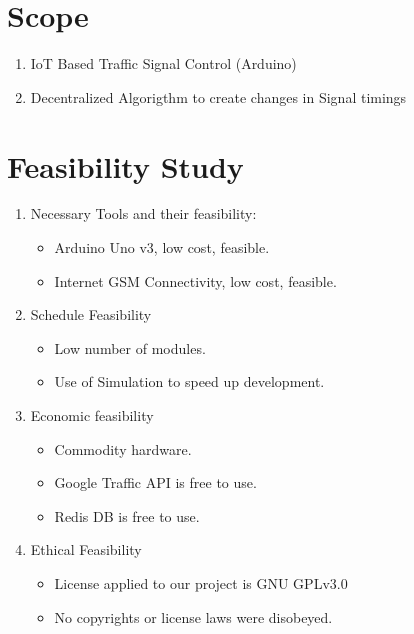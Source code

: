 \documentclass[12pt,a4paper,final]{article}
\begin{document}
\begin{flushleft}
\noindent
\section{Scope}
\begin{enumerate}
\item
IoT Based Traffic Signal Control (Arduino)
\item
Decentralized Algorigthm to create changes in Signal timings
\end{enumerate}

\noindent
\section{Feasibility Study}
\begin{enumerate}
\item
Necessary Tools and their feasibility:\\
\begin{itemize}
\item Arduino Uno v3, low cost, feasible.\\
\item Internet GSM Connectivity, low cost, feasible.\\
\end{itemize} 
\item 
Schedule Feasibility\\
\begin{itemize}
\item Low number of modules.\\
\item Use of Simulation to speed up development.\\
\end{itemize}
\item 
Economic feasibility\\
\begin{itemize}
\item Commodity hardware.\\
\item Google Traffic API is free to use.\\
\item Redis DB is free to use.\\
\end{itemize}

\item 
Ethical Feasibility\\
\begin{itemize}
\item License applied to our project is GNU GPLv3.0\\
\item No copyrights or license laws were disobeyed.\\
\end{itemize}


\end{enumerate}
\end{flushleft}
\end{document}
